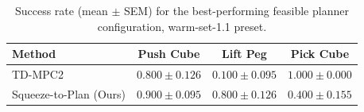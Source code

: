 \begin{table}[t]
\centering
\begin{tabular}{lccc}
\toprule
Method & Push Cube & Lift Peg & Pick Cube \\
\midrule
TD-MPC2 & $0.800 \pm 0.126$ & $0.100 \pm 0.095$ & $1.000 \pm 0.000$ \\
Squeeze-to-Plan (Ours) & $0.900 \pm 0.095$ & $0.800 \pm 0.126$ & $0.400 \pm 0.155$ \\
\bottomrule
\end{tabular}
\caption{Success rate (mean $\pm$ SEM) for the best-performing feasible planner configuration, warm-set-1.1 preset.}
\label{tab:latency_vs_success_rate_warm-set-1.1}
\end{table}
